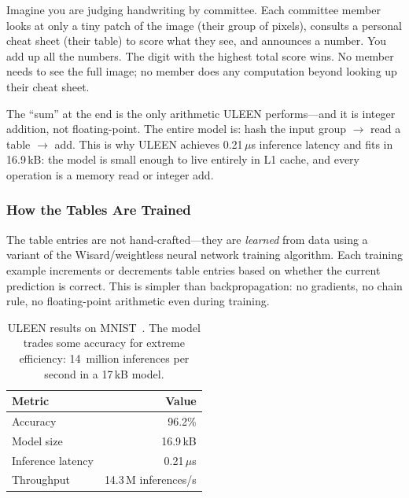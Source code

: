 \begin{analogy}
Imagine you are judging handwriting by committee. Each committee
member looks at only a tiny patch of the image (their group of
pixels), consults a personal cheat sheet (their table) to score
what they see, and announces a number. You add up all the numbers.
The digit with the highest total score wins. No member needs to
see the full image; no member does any computation beyond looking
up their cheat sheet.
\end{analogy}

\begin{engineernote}
The ``sum'' at the end is the only arithmetic ULEEN performs---and it
is integer addition, not floating-point. The entire model is: hash
the input group $\to$ read a table $\to$ add. This is why ULEEN
achieves 0.21\,$\mu$s inference latency and fits in 16.9\,kB: the
model is small enough to live entirely in L1 cache, and every
operation is a memory read or integer add.
\end{engineernote}

\subsubsection{How the Tables Are Trained}

The table entries are not hand-crafted---they are \emph{learned}
from data using a variant of the Wisard/weightless neural network
training algorithm. Each training example increments or decrements
table entries based on whether the current prediction is correct.
This is simpler than backpropagation: no gradients, no chain rule,
no floating-point arithmetic even during training.

\begin{table}[htbp]
\centering
\caption{ULEEN results on MNIST~\cite{uleen2023}. The model trades
  some accuracy for extreme efficiency: 14~million inferences per
  second in a 17\,kB model.}
\label{tab:uleen}
\begin{tabular}{@{}lr@{}}
  \toprule
  \textbf{Metric} & \textbf{Value} \\
  \midrule
  Accuracy          & 96.2\% \\
  Model size         & 16.9\,kB \\
  Inference latency  & 0.21\,$\mu$s \\
  Throughput         & 14.3\,M inferences/s \\
  \bottomrule
\end{tabular}
\end{table}

